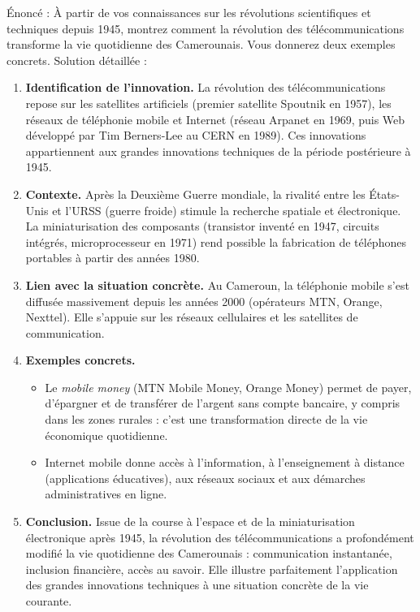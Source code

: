 \documentclass[11pt]{article}
\newcommand{\cle}[1]{{\popxbold\color{popdark}#1}}
\begin{document}
\begin{exoresolu}
Énoncé : À partir de vos connaissances sur les révolutions scientifiques et techniques depuis 1945, montrez comment la révolution des télécommunications transforme la vie quotidienne des Camerounais. Vous donnerez deux exemples concrets.
\tcblower
Solution détaillée :
\begin{enumerate}
\item \textbf{Identification de l'innovation.} La révolution des télécommunications repose sur les satellites artificiels (premier satellite \cle{Spoutnik} en 1957), les réseaux de téléphonie mobile et Internet (réseau \cle{Arpanet} en 1969, puis \cle{Web} développé par \cle{Tim Berners-Lee} au \cle{CERN} en 1989). Ces innovations appartiennent aux grandes innovations techniques de la période postérieure à 1945.
\item \textbf{Contexte.} Après la Deuxième Guerre mondiale, la rivalité entre les États-Unis et l'URSS (guerre froide) stimule la recherche spatiale et électronique. La miniaturisation des composants (transistor inventé en 1947, circuits intégrés, microprocesseur en 1971) rend possible la fabrication de téléphones portables à partir des années 1980.
\item \textbf{Lien avec la situation concrète.} Au Cameroun, la téléphonie mobile s'est diffusée massivement depuis les années 2000 (opérateurs \cle{MTN}, \cle{Orange}, \cle{Nexttel}). Elle s'appuie sur les réseaux cellulaires et les satellites de communication.
\item \textbf{Exemples concrets.}
\begin{itemize}
\item Le \emph{mobile money} (\cle{MTN Mobile Money}, \cle{Orange Money}) permet de payer, d'épargner et de transférer de l'argent sans compte bancaire, y compris dans les zones rurales : c'est une transformation directe de la vie économique quotidienne.
\item Internet mobile donne accès à l'information, à l'enseignement à distance (applications éducatives), aux réseaux sociaux et aux démarches administratives en ligne.
\end{itemize}
\item \textbf{Conclusion.} Issue de la course à l'espace et de la miniaturisation électronique après 1945, la révolution des télécommunications a profondément modifié la vie quotidienne des Camerounais : communication instantanée, inclusion financière, accès au savoir. Elle illustre parfaitement l'application des grandes innovations techniques à une situation concrète de la vie courante.
\end{enumerate}
\end{exoresolu}
\end{document}
